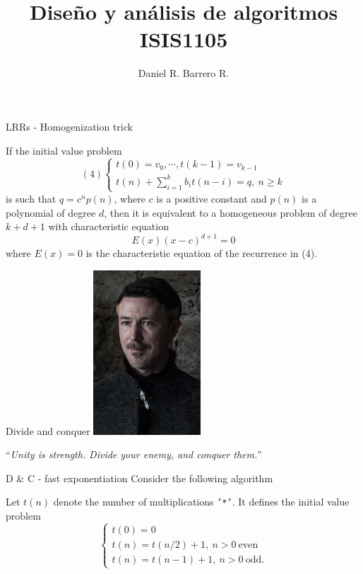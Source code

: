 \documentclass{beamer}
\title{Diseño y análisis de algoritmos \\ ISIS1105}
\author{Daniel R. Barrero R.}
\institute{Universidad de los Andes}
\begin{document}
\frame{\titlepage}

%

\begin{frame}{LRRs - Homogenization trick}
	\begin{thm}[2]\label{ht}
		If the initial value problem
		\begin{displaymath}(4)
			\begin{cases}
				t(0)= v_0, \cdots, t(k-1)= v_{k-1}\\
				t(n) + \sum_{i= 1}^k b_it(n-i)= q,\ n \geq k
			\end{cases}
		\end{displaymath}
		is such that $q = c^np(n)$, where $c$ is a positive constant and
		$p(n)$ is a polynomial of degree $d$, then it is equivalent to a
		homogeneous problem of degree $k+d+1$ with characteristic equation
		\begin{equation*}
			E(x)(x-c)^{d+1} = 0
		\end{equation*}
		where $E(x) = 0$ is the characteristic equation of the recurrence
		in (4).
	\end{thm}
\end{frame}

\begin{frame}{Divide and conquer}
	\centering
	\includegraphics[width=0.3\textwidth]{strategist.png}
	
	\bigskip
	``\emph{Unity is strength. Divide your enemy, and conquer them.}''
\end{frame}

%

\begin{frame}{D \& C - fast exponentiation}
	Consider the following algorithm
	
	
	
	Let $t(n)$ denote the number of multiplications \texttt{'*'}. It defines the
	initial value problem
	\[
		\begin{cases}
			t(0)= 0\\
			t(n)= t(n/2) + 1,\ n > 0\ \text{even}\\
			t(n)= t(n-1) + 1,\ n > 0\ \text{odd}.
		\end{cases}
	\]
\end{frame}
\end{document}
